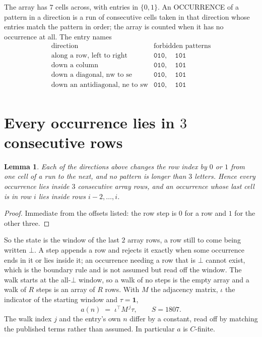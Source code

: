 \documentclass[11pt,a4paper]{article}
\theoremstyle{plain}
\newtheorem{lemma}[theorem]{Lemma}
\theoremstyle{definition}
\begin{document}
The array has $7$ cells across, with entries in $\{0,1\}$. An OCCURRENCE of a pattern in a
direction is a run of consecutive cells taken in that direction whose entries match the pattern
in order; the array is counted when it has no occurrence at all. The entry names
\[
\begin{array}{ll}
\text{direction} & \text{forbidden patterns} \\[2pt]
\text{along a row, left to right} & \mathtt{010},\quad \mathtt{101} \\
\text{down a column} & \mathtt{010},\quad \mathtt{101} \\
\text{down a diagonal, nw to se} & \mathtt{010},\quad \mathtt{101} \\
\text{down an antidiagonal, ne to sw} & \mathtt{010},\quad \mathtt{101} \\
\end{array}
\]


\section{Every occurrence lies in $3$ consecutive rows}

\begin{lemma}\label{lem:win}
Each of the directions above changes the row index by $0$ or $1$ from one cell of a run to the
next, and no pattern is longer than $3$ letters. Hence every occurrence lies inside $3$
consecutive array rows, and an occurrence whose last cell is in row $i$ lies inside rows
$i-2,\dots,i$.
\end{lemma}

\begin{proof}
Immediate from the offsets listed: the row step is $0$ for a row and $1$ for the other three.
\end{proof}

So the state is the window of the last $2$ array rows, a row still to come being written
$\bot$. A step appends a row and rejects it exactly when some occurrence ends in it or lies
inside it; an occurrence needing a row that is $\bot$ cannot exist, which is the boundary rule
and is not assumed but read off the window. The walk starts at the all-$\bot$ window, so a walk
of no steps is the empty array and a walk of $R$ steps is an array of $R$ rows. With $M$ the
adjacency matrix, $\iota$ the indicator of the starting window and $\tau=\mathbf{1}$,
\[
a(n)\;=\;\iota^{\!\top}M^{\,j}\tau ,\qquad S=1807.
\]
The walk index $j$ and the entry's own $n$ differ by a constant, read off by matching the
published terms rather than assumed. In particular $a$ is $C$-finite.
\end{document}

